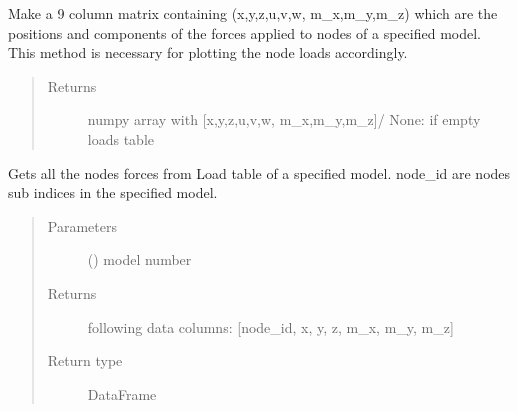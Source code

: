\documentclass[letterpaper,10pt,english]{sphinxmanual}
\begin{document}
\begin{fulllineitems}
\begin{fulllineitems}
\label{\detokenize{api:beamon.database.database.Database.get_loads_for_plotting}}
Make a 9 column matrix containing (x,y,z,u,v,w, m\_x,m\_y,m\_z) which are the positions and components of the
forces applied to nodes of a specified model.
This method is necessary for plotting the node loads accordingly.
\begin{quote}\begin{description}
\item[{Returns}] \leavevmode
numpy array with {[}x,y,z,u,v,w, m\_x,m\_y,m\_z{]}/ None: if empty loads table

\end{description}\end{quote}

\end{fulllineitems}


\begin{fulllineitems}
\label{\detokenize{api:beamon.database.database.Database.get_loads_for_simulation}}
Gets all the nodes forces from Load table of a specified model.
node\_id are nodes sub indices in the specified model.
\begin{quote}\begin{description}
\item[{Parameters}] \leavevmode
{} () \textendash{} model number

\item[{Returns}] \leavevmode
following data columns: {[}node\_id, x, y, z, m\_x, m\_y, m\_z{]}

\item[{Return type}] \leavevmode
DataFrame

\end{description}\end{quote}


\end{fulllineitems}
\end{fulllineitems}
\end{document}
